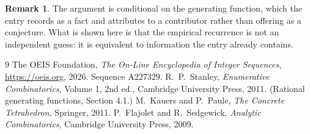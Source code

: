 \documentclass[11pt,a4paper]{article}
\theoremstyle{plain}
\theoremstyle{definition}
\newtheorem{remark}[theorem]{Remark}
\begin{document}
\begin{remark}
The argument is conditional on the generating function, which the entry records as a fact and
attributes to a contributor rather than offering as a conjecture. What is shown here is that
the empirical recurrence is not an independent guess: it is equivalent to information the
entry already contains.
\end{remark}

\begin{thebibliography}{9}
 The OEIS Foundation, \emph{The On-Line Encyclopedia of Integer
Sequences}, \url{https://oeis.org}, 2026. Sequence A227329.
 R.~P.~Stanley, \emph{Enumerative Combinatorics}, Volume 1, 2nd ed.,
Cambridge University Press, 2011. (Rational generating functions, Section 4.1.)
 M.~Kauers and P.~Paule, \emph{The Concrete Tetrahedron}, Springer, 2011.
 P.~Flajolet and R.~Sedgewick, \emph{Analytic Combinatorics}, Cambridge
University Press, 2009.
\end{thebibliography}
\end{document}
